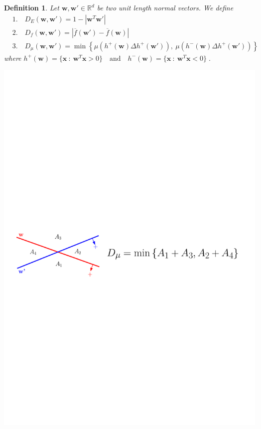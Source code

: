 \documentclass[largefonts,landscape]{sciposter}
\newtheorem*{definition}{Definition}
\newcommand{\R}{\mathbb{R}}
\newcommand{\x}{\mathbf{x}}
\newcommand{\w}{\mathbf{w}}
\begin{document}
\begin{multicols}{3}
\begin{definition}
Let $\w, \w' \in \R^d$ be two unit length normal vectors. We define
\begin{align*}
& \text{1.} \quad D_E(\w,\w')  = 1-\left| \w^T \w' \right| \\
& \text{2.} \quad D_{f}(\w,\w') = \left| \overline{f}(\w') - \overline{f}(\w) \right| \\
& \text{3.} \quad D_{\mu}(\w,\w') = \min \left\{ \mu(h^+(\w) \Delta h^+(\w')), \ \mu(h^-(\w) \Delta h^+(\w')) \right\}
\end{align*}
where
$
h^+(\w) = \{ \x ~:~ \w^T \x > 0 \} \quad \text{and} \quad h^-(\w) = \{ \x ~:~ \w^T \x < 0 \} \; .
$
\end{definition}

\begin{center}
\includegraphics[scale=1.7]{two-hyperplanes}
\end{center}


\end{multicols}
\end{document}
